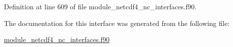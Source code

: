 Definition at line 609 of file module\+\_\+netcdf4\+\_\+nc\+\_\+interfaces.\+f90.



The documentation for this interface was generated from the following file\+:\begin{DoxyCompactItemize}
\item 
\hyperlink{module__netcdf4__nc__interfaces_8f90}{module\+\_\+netcdf4\+\_\+nc\+\_\+interfaces.\+f90}\end{DoxyCompactItemize}
